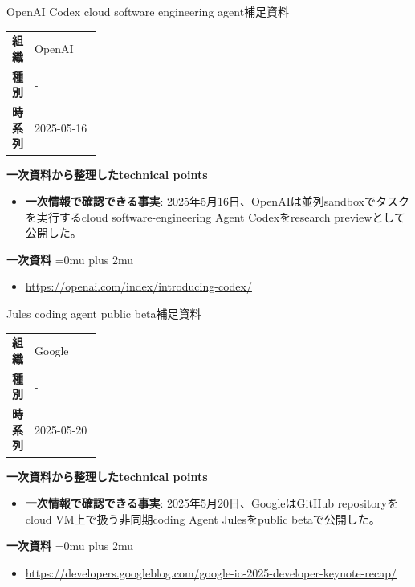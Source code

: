 \begin{technicalnote}{OpenAI Codex cloud software engineering agent}{補足資料}
\begingroup
\begin{tabularx}{\linewidth}{@{}>{\bfseries}p{0.22\linewidth}X@{}}
組織 & OpenAI \\
種別 & - \\
時系列 & 2025-05-16 \\
\end{tabularx}
\smallskip
{\bfseries 一次資料から整理したtechnical points}
\begin{itemize}[leftmargin=1.5em,itemsep=0.35em]
\item \textbf{一次情報で確認できる事実}: 2025年5月16日、OpenAIは並列sandboxでタスクを実行するcloud software-engineering Agent Codexをresearch previewとして公開した。
\end{itemize}
\begin{samepage}
{\bfseries 一次資料}
\begingroup\sloppy
\Urlmuskip=0mu plus 2mu\relax
\begin{itemize}[leftmargin=1.5em,itemsep=0.25em]
\item {\scriptsize\url{https://openai.com/index/introducing-codex/}}
\end{itemize}
\endgroup
\end{samepage}
\endgroup
\end{technicalnote}
\medskip

\begin{technicalnote}{Jules coding agent public beta}{補足資料}
\begingroup
\begin{tabularx}{\linewidth}{@{}>{\bfseries}p{0.22\linewidth}X@{}}
組織 & Google \\
種別 & - \\
時系列 & 2025-05-20 \\
\end{tabularx}
\smallskip
{\bfseries 一次資料から整理したtechnical points}
\begin{itemize}[leftmargin=1.5em,itemsep=0.35em]
\item \textbf{一次情報で確認できる事実}: 2025年5月20日、GoogleはGitHub repositoryをcloud VM上で扱う非同期coding Agent Julesをpublic betaで公開した。
\end{itemize}
\begin{samepage}
{\bfseries 一次資料}
\begingroup\sloppy
\Urlmuskip=0mu plus 2mu\relax
\begin{itemize}[leftmargin=1.5em,itemsep=0.25em]
\item {\scriptsize\url{https://developers.googleblog.com/google-io-2025-developer-keynote-recap/}}
\end{itemize}
\endgroup
\end{samepage}
\endgroup
\end{technicalnote}
\medskip


